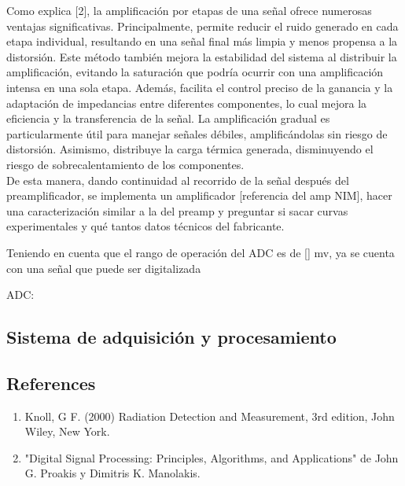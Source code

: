\documentclass[]{book}
\begin{document}
Como explica [2], la amplificación por etapas de una señal ofrece numerosas ventajas significativas. Principalmente, permite reducir el ruido generado en cada etapa individual, resultando en una señal final más limpia y menos propensa a la distorsión. Este método también mejora la estabilidad del sistema al distribuir la amplificación, evitando la saturación que podría ocurrir con una amplificación intensa en una sola etapa. Además, facilita el control preciso de la ganancia y la adaptación de impedancias entre diferentes componentes, lo cual mejora la eficiencia y la transferencia de la señal. La amplificación gradual es particularmente útil para manejar señales débiles, amplificándolas sin riesgo de distorsión. Asimismo, distribuye la carga térmica generada, disminuyendo el riesgo de sobrecalentamiento de los componentes. \\


De esta manera, dando continuidad al recorrido de la señal después del preamplificador, se implementa un amplificador [referencia del amp NIM], hacer una caracterización similar a la del preamp y preguntar si sacar curvas experimentales y qué tantos datos técnicos del fabricante.

Teniendo en cuenta que el rango de operación del ADC es de [] mv, ya se cuenta con una señal que puede ser digitalizada

ADC:



\subsection*{Sistema de adquisición y procesamiento}

\noindent 

\subsection*{References}
\begin{enumerate}
    \item Knoll, G F. (2000) Radiation Detection and Measurement, 3rd edition, John Wiley, New
    York.
    \item "Digital Signal Processing: Principles, Algorithms, and Applications" de John G. Proakis y Dimitris K. Manolakis.
\end{enumerate}
\end{document}
